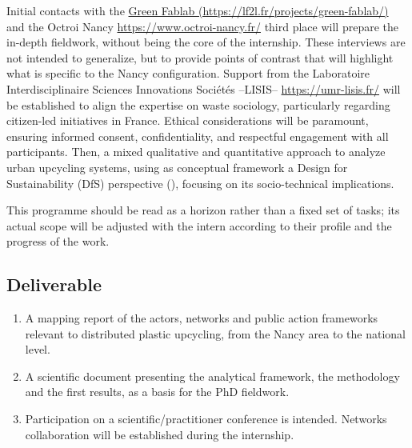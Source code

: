 \documentclass[
  english,
  11pt,
]{article}
\begin{document}
Initial contacts with the
\href{https://lf2l.fr/projects/green-fablab/}{Green Fablab
(https://lf2l.fr/projects/green-fablab/)} and the Octroi Nancy
\url{https://www.octroi-nancy.fr/} third place will prepare the in-depth
fieldwork, without being the core of the internship. These interviews
are not intended to generalize, but to provide points of contrast that
will highlight what is specific to the Nancy configuration. Support from
the Laboratoire Interdisciplinaire Sciences Innovations Sociétés
--LISIS-- \url{https://umr-lisis.fr/} will be established to align the
expertise on waste sociology, particularly regarding citizen-led
initiatives in France. Ethical considerations will be paramount,
ensuring informed consent, confidentiality, and respectful engagement
with all participants. Then, a mixed qualitative and quantitative
approach to analyze urban upcycling systems, using as conceptual
framework a Design for Sustainability (DfS) perspective
(), focusing on
its socio-technical implications.

\begin{tcolorbox}[enhanced jigsaw, arc=.35mm, bottomrule=.15mm, bottomtitle=1mm, breakable, colback=white, colbacktitle=quarto-callout-note-color!10!white, colframe=quarto-callout-note-color-frame, coltitle=black, left=2mm, leftrule=.75mm, opacityback=0, opacitybacktitle=0.6, rightrule=.15mm, title=\textcolor{quarto-callout-note-color}{\faInfo}\hspace{0.5em}{Note on scope}, titlerule=0mm, toprule=.15mm, toptitle=1mm]

This programme should be read as a horizon rather than a fixed set of
tasks; its actual scope will be adjusted with the intern according to
their profile and the progress of the work.

\end{tcolorbox}

\subsection{Deliverable}\label{deliverable}

\begin{enumerate}
\def\labelenumi{\arabic{enumi}.}
\item
  A mapping report of the actors, networks and public action frameworks
  relevant to distributed plastic upcycling, from the Nancy area to the
  national level.
\item
  A scientific document presenting the analytical framework, the
  methodology and the first results, as a basis for the PhD fieldwork.
\item
  Participation on a scientific/practitioner conference is intended.
  Networks collaboration will be established during the internship.
\end{enumerate}
\end{document}
